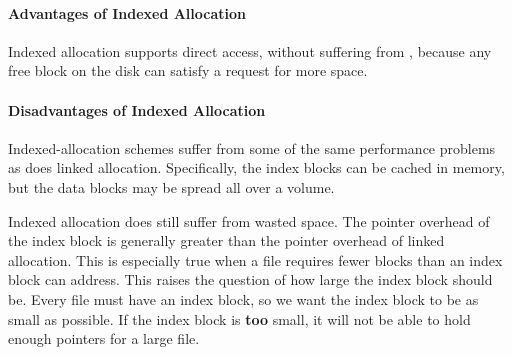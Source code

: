 \paragraph{Advantages of Indexed Allocation}\label{par:Indexed_File_Allocation_Advantages}
Indexed allocation supports direct access, without suffering from , because any free block on the disk can satisfy a request for more space.

\paragraph{Disadvantages of Indexed Allocation}\label{par:Indexed_File_Allocation_Disadvantages}
Indexed-allocation schemes suffer from some of the same performance problems as does linked allocation.
Specifically, the index blocks can be cached in memory, but the data blocks may be spread all over a volume.

Indexed allocation does still suffer from wasted space.
The pointer overhead of the index block is generally greater than the pointer overhead of linked allocation.
This is especially true when a file requires fewer blocks than an index block can address.
This raises the question of how large the index block should be.
Every file must have an index block, so we want the index block to be as small as possible.
If the index block is \textbf{too} small, it will not be able to hold enough pointers for a large file.


